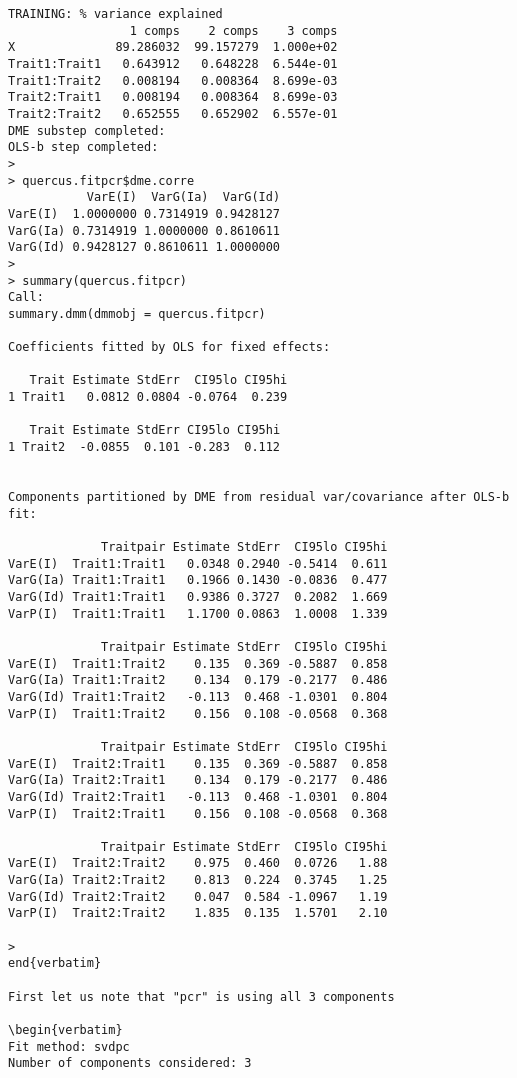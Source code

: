 \documentclass[titlepage]{article}  %
\begin{document}
\begin{verbatim}
TRAINING: % variance explained
                 1 comps    2 comps    3 comps
X              89.286032  99.157279  1.000e+02
Trait1:Trait1   0.643912   0.648228  6.544e-01
Trait1:Trait2   0.008194   0.008364  8.699e-03
Trait2:Trait1   0.008194   0.008364  8.699e-03
Trait2:Trait2   0.652555   0.652902  6.557e-01
DME substep completed:
OLS-b step completed:
> 
> quercus.fitpcr$dme.corre
           VarE(I)  VarG(Ia)  VarG(Id)
VarE(I)  1.0000000 0.7314919 0.9428127
VarG(Ia) 0.7314919 1.0000000 0.8610611
VarG(Id) 0.9428127 0.8610611 1.0000000
>
> summary(quercus.fitpcr)
Call:
summary.dmm(dmmobj = quercus.fitpcr)

Coefficients fitted by OLS for fixed effects:

   Trait Estimate StdErr  CI95lo CI95hi
1 Trait1   0.0812 0.0804 -0.0764  0.239

   Trait Estimate StdErr CI95lo CI95hi
1 Trait2  -0.0855  0.101 -0.283  0.112


Components partitioned by DME from residual var/covariance after OLS-b fit:

             Traitpair Estimate StdErr  CI95lo CI95hi
VarE(I)  Trait1:Trait1   0.0348 0.2940 -0.5414  0.611
VarG(Ia) Trait1:Trait1   0.1966 0.1430 -0.0836  0.477
VarG(Id) Trait1:Trait1   0.9386 0.3727  0.2082  1.669
VarP(I)  Trait1:Trait1   1.1700 0.0863  1.0008  1.339

             Traitpair Estimate StdErr  CI95lo CI95hi
VarE(I)  Trait1:Trait2    0.135  0.369 -0.5887  0.858
VarG(Ia) Trait1:Trait2    0.134  0.179 -0.2177  0.486
VarG(Id) Trait1:Trait2   -0.113  0.468 -1.0301  0.804
VarP(I)  Trait1:Trait2    0.156  0.108 -0.0568  0.368

             Traitpair Estimate StdErr  CI95lo CI95hi
VarE(I)  Trait2:Trait1    0.135  0.369 -0.5887  0.858
VarG(Ia) Trait2:Trait1    0.134  0.179 -0.2177  0.486
VarG(Id) Trait2:Trait1   -0.113  0.468 -1.0301  0.804
VarP(I)  Trait2:Trait1    0.156  0.108 -0.0568  0.368

             Traitpair Estimate StdErr  CI95lo CI95hi
VarE(I)  Trait2:Trait2    0.975  0.460  0.0726   1.88
VarG(Ia) Trait2:Trait2    0.813  0.224  0.3745   1.25
VarG(Id) Trait2:Trait2    0.047  0.584 -1.0967   1.19
VarP(I)  Trait2:Trait2    1.835  0.135  1.5701   2.10

> 
end{verbatim}

First let us note that "pcr" is using all 3 components

\begin{verbatim}
Fit method: svdpc
Number of components considered: 3
\end{verbatim}
\end{document}
